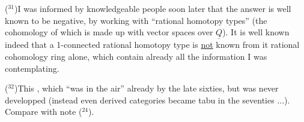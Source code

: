 ($^{31}$)\quad I was informed by knowledgeable people soon later that the answer is
well known to be negative,  by working with ``rational homotopy types''
(the cohomology of which is made up with vector spaces over $\underline{Q}$). It is well
known indeed that a 1-connected rational homotopy type is \uline{not} known from
it rational cohomology ring alone,  which  contain already all the information I was contemplating.\deleted{\unsure{(*)}}

($^{32}$)\quad This  , which
``was in the air'' already by the late sixties,  but was never developped 
(instead even derived categories became tabu in the seventies ...). Compare
with note ($^{24}$).

